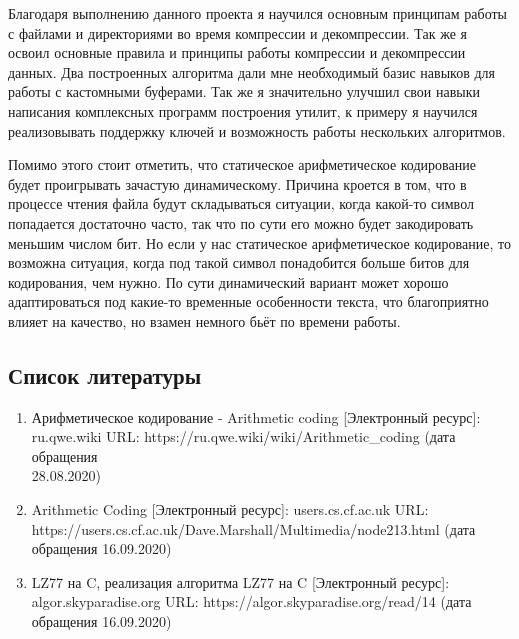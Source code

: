 \documentclass[12pt]{article}
\begin{document}
Благодаря выполнению данного проекта я научился основным принципам работы с файлами и директориями во время компрессии и декомпрессии. Так же я освоил основные правила и принципы работы компрессии и декомпрессии данных. Два построенных алгоритма дали мне необходимый базис навыков для работы с кастомными буферами. Так же я значительно улучшил свои навыки написания комплексных программ построения утилит, к примеру я научился реализовывать поддержку ключей и возможность работы нескольких алгоритмов.

Помимо этого стоит отметить, что статическое арифметическое кодирование будет проигрывать зачастую динамическому. Причина кроется в том, что в процессе чтения файла будут складываться ситуации, когда какой-то символ попадается достаточно часто, так что по сути его можно будет закодировать меньшим числом бит. Но если у нас статическое арифметическое кодирование, то возможна ситуация, когда под такой символ понадобится больше битов для кодирования, чем нужно. По сути динамический вариант может хорошо адаптироваться под какие-то временные особенности текста, что благоприятно влияет на качество, но взамен немного бьёт по времени работы.



\subsection*{Список литературы}
\begin{enumerate}
	\item Арифметическое кодирование - Arithmetic coding [Электронный ресурс]:\\ ru.qwe.wiki URL: https://ru.qwe.wiki/wiki/Arithmetic\_coding (дата обращения\\ 28.08.2020)
	\item Arithmetic Coding [Электронный ресурс]: users.cs.cf.ac.uk URL:\\ https://users.cs.cf.ac.uk/Dave.Marshall/Multimedia/node213.html (дата обращения 16.09.2020)
	\item LZ77 на C, реализация алгоритма LZ77 на C [Электронный ресурс]:\\ algor.skyparadise.org URL: https://algor.skyparadise.org/read/14 (дата обращения 16.09.2020)
\end{enumerate}
\end{document}
